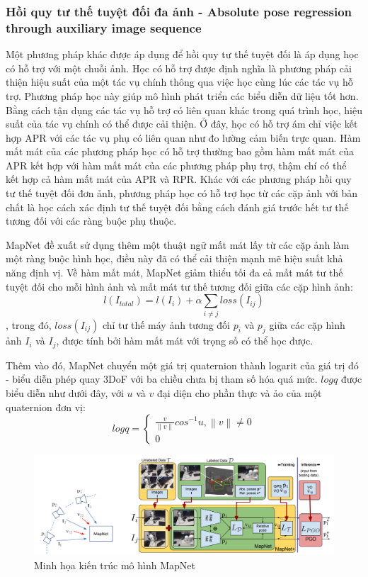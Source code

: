 \subsubsection*{Hồi quy tư thế tuyệt đối đa ảnh - Absolute pose regression through auxiliary image sequence}
Một phương pháp khác được áp dụng để hồi quy tư thế tuyệt đối là áp dụng học có hỗ trợ với một chuỗi ảnh. Học có hỗ trợ được định nghĩa là phương pháp cải thiện hiệu suất của một tác vụ chính thông qua việc học cùng lúc các tác vụ hỗ trợ. Phương pháp học này giúp mô hình phát triển các biểu diễn dữ liệu tốt hơn. Bằng cách tận dụng các tác vụ hỗ trợ có liên quan khác trong quá trình học, hiệu suất của tác vụ chính có thể được cải thiện. Ở đây, học có hỗ trợ ám chỉ việc kết hợp APR với các tác vụ phụ có liên quan như đo lường cảm biến trực quan. Hàm mất mát của các phương pháp học có hỗ trợ thường bao gồm hàm mất mát của APR kết hợp với hàm mất mát của các phương pháp phụ trợ, thậm chí có thể kết hợp cả hàm mất mát của APR và RPR. Khác với các phương pháp hồi quy tư thế tuyệt đối đơn ảnh, phương pháp học có hỗ trợ học từ các cặp ảnh với bản chất là học cách xác định tư thế tuyệt đối bằng cách đánh giá trước hết tư thế tương đối với các ràng buộc phụ thuộc.

MapNet \cite{brahmbhatt2018geometryaware} đề xuất sử dụng thêm một thuật ngữ mất mát lấy từ các cặp ảnh làm một ràng buộc hình học, điều này đã có thể cải thiện mạnh mẽ hiệu suất khả năng định vị. Về hàm mất mát, MapNet giảm thiểu tối đa cả mất mát tư thế tuyệt đối cho mỗi hình ảnh và mất mát tư thế tương đối giữa các cặp hình ảnh:
\begin{equation}
    l(I_{total}) = l(I_i) + \alpha\sum_{i\neq j}loss(I_{ij} )
\end{equation},
trong đó, $loss(I_{ij} )$ chỉ tư thế máy ảnh tương đối $p_i$ và $p_j$ giữa các cặp hình ảnh $I_i$ và $I_j$, được tính bởi hàm mất mát với trọng số có thể học được.

Thêm vào đó, MapNet chuyển một giá trị quaternion thành logarit của giá trị đó - biểu diễn phép quay 3DoF với ba chiều chưa bị tham số hóa quá mức. $logq$ được biểu diễn như dưới đây, với $u$ và $v$ đại diện cho phần thực và ảo của một quaternion đơn vị:
\begin{equation}
    logq =
    \begin{cases}
        \frac{v}{\left \| v \right \|}cos^{-1}u, \left \| v \right \| \neq 0 \\
        0
    \end{cases}
\end{equation}
\begin{figure}[H]
    \centering
    \includegraphics[width=\textwidth]{pics/Chapter2/mapnet.png}
    \caption{Minh họa kiến trúc mô hình MapNet \cite{brahmbhatt2018geometryaware}}
\end{figure}

